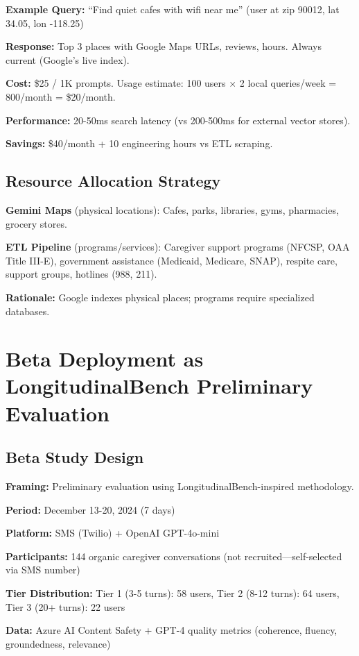 \documentclass{article}%
\begin{document}
\textbf{Example Query:} ``Find quiet cafes with wifi near me'' (user at zip 90012, lat 34.05, lon -118.25)

\textbf{Response:} Top 3 places with Google Maps URLs, reviews, hours. Always current (Google's live index).

\textbf{Cost:} \$25 / 1K prompts. Usage estimate: 100 users $\times$ 2 local queries/week = 800/month = \$20/month.

\textbf{Performance:} 20-50ms search latency (vs 200-500ms for external vector stores).

\textbf{Savings:} \$40/month + 10 engineering hours vs ETL scraping.

%
\subsection{Resource Allocation Strategy}%
\label{subsec:ResourceAllocationStrategy}%
\textbf{Gemini Maps} (physical locations): Cafes, parks, libraries, gyms, pharmacies, grocery stores.

\textbf{ETL Pipeline} (programs/services): Caregiver support programs (NFCSP, OAA Title III-E), government assistance (Medicaid, Medicare, SNAP), respite care, support groups, hotlines (988, 211).

\textbf{Rationale:} Google indexes physical places; programs require specialized databases.

%
\section{Beta Deployment as LongitudinalBench Preliminary Evaluation}%
\label{sec:BetaDeploymentasLongitudinalBenchPreliminaryEvaluation}%
%
\subsection{Beta Study Design}%
\label{subsec:BetaStudyDesign}%
\textbf{Framing:} Preliminary evaluation using LongitudinalBench-inspired methodology.

\textbf{Period:} December 13-20, 2024 (7 days)

\textbf{Platform:} SMS (Twilio) + OpenAI GPT-4o-mini

\textbf{Participants:} 144 organic caregiver conversations (not recruited—self-selected via SMS number)

\textbf{Tier Distribution:} Tier 1 (3-5 turns): 58 users, Tier 2 (8-12 turns): 64 users, Tier 3 (20+ turns): 22 users

\textbf{Data:} Azure AI Content Safety + GPT-4 quality metrics (coherence, fluency, groundedness, relevance)
\end{document}
